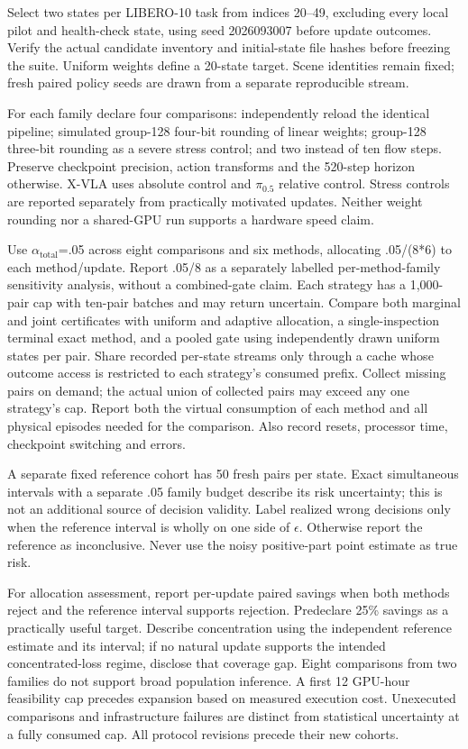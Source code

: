 \documentclass[conference]{IEEEtran}
\begin{document}
Select two states per LIBERO-10 task from indices 20--49, excluding every local pilot and health-check state, using seed 2026093007 before update outcomes. Verify the actual candidate inventory and initial-state file hashes before freezing the suite. Uniform weights define a 20-state target. Scene identities remain fixed; fresh paired policy seeds are drawn from a separate reproducible stream.

For each family declare four comparisons: independently reload the identical pipeline; simulated group-128 four-bit rounding of linear weights; group-128 three-bit rounding as a severe stress control; and two instead of ten flow steps. Preserve checkpoint precision, action transforms and the 520-step horizon otherwise. X-VLA uses absolute control and $\pi_{0.5}$ relative control. Stress controls are reported separately from practically motivated updates. Neither weight rounding nor a shared-GPU run supports a hardware speed claim.

Use $\alpha_{\mathrm{total}}$=.05 across eight comparisons and six methods, allocating .05/(8*6) to each method/update. Report .05/8 as a separately labelled per-method-family sensitivity analysis, without a combined-gate claim. Each strategy has a 1,000-pair cap with ten-pair batches and may return uncertain. Compare both marginal and joint certificates with uniform and adaptive allocation, a single-inspection terminal exact method, and a pooled gate using independently drawn uniform states per pair. Share recorded per-state streams only through a cache whose outcome access is restricted to each strategy's consumed prefix. Collect missing pairs on demand; the actual union of collected pairs may exceed any one strategy's cap. Report both the virtual consumption of each method and all physical episodes needed for the comparison. Also record resets, processor time, checkpoint switching and errors.

A separate fixed reference cohort has 50 fresh pairs per state. Exact simultaneous intervals with a separate .05 family budget describe its risk uncertainty; this is not an additional source of decision validity. Label realized wrong decisions only when the reference interval is wholly on one side of $\epsilon$. Otherwise report the reference as inconclusive. Never use the noisy positive-part point estimate as true risk.

For allocation assessment, report per-update paired savings when both methods reject and the reference interval supports rejection. Predeclare 25\% savings as a practically useful target. Describe concentration using the independent reference estimate and its interval; if no natural update supports the intended concentrated-loss regime, disclose that coverage gap. Eight comparisons from two families do not support broad population inference. A first 12 GPU-hour feasibility cap precedes expansion based on measured execution cost. Unexecuted comparisons and infrastructure failures are distinct from statistical uncertainty at a fully consumed cap. All protocol revisions precede their new cohorts.
\end{document}
